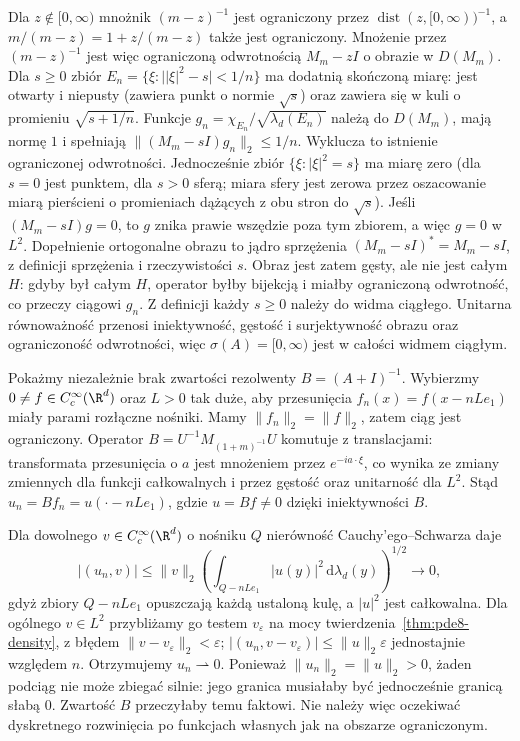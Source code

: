 \begin{kontrprzyklad}
Dla $z\notin[0,\infty)$ mnożnik $(m-z)^{-1}$ jest
ograniczony przez $\operatorname{dist}(z,[0,\infty))^{-1}$,
a $m/(m-z)=1+z/(m-z)$ także jest ograniczony.
Mnożenie przez $(m-z)^{-1}$ jest więc ograniczoną
odwrotnością $M_m-zI$ o obrazie w $D(M_m)$.
Dla $s\ge0$ zbiór
$E_n=\{\xi:\big||\xi|^2-s\big|<1/n\}$ ma dodatnią
skończoną miarę: jest otwarty i niepusty (zawiera
punkt o normie $\sqrt{s}$) oraz zawiera się w kuli
o promieniu $\sqrt{s+1/n}$. Funkcje $g_n=\chi_{E_n}/\sqrt{\lambda_d(E_n)}$
należą do $D(M_m)$, mają normę $1$ i spełniają
$\|(M_m-sI)g_n\|_2\le1/n$. Wyklucza to istnienie
ograniczonej odwrotności. Jednocześnie zbiór
$\{\xi:|\xi|^2=s\}$ ma miarę zero (dla $s=0$ jest
punktem, dla $s>0$ sferą; miara sfery jest zerowa
przez oszacowanie miarą pierścieni o promieniach
dążących z obu stron do $\sqrt{s}$).
Jeśli $(M_m-sI)g=0$, to $g$ znika prawie wszędzie
poza tym zbiorem, a więc $g=0$ w $L^2$.
Dopełnienie ortogonalne obrazu to jądro sprzężenia
$(M_m-sI)^*=M_m-sI$, z definicji sprzężenia
i rzeczywistości $s$. Obraz jest zatem gęsty,
ale nie jest całym $H$: gdyby był całym $H$,
operator byłby bijekcją i miałby ograniczoną odwrotność,
co przeczy ciągowi $g_n$.
Z definicji każdy $s\ge0$ należy do widma ciągłego.
Unitarna równoważność przenosi iniektywność, gęstość
i surjektywność obrazu oraz ograniczoność odwrotności,
więc $\sigma(A)=[0,\infty)$ jest w całości widmem ciągłym.

Pokażmy niezależnie brak zwartości rezolwenty $B=(A+I)^{-1}$.
Wybierzmy $0\ne f\in C_c^\infty(\R^d)$ oraz $L>0$
tak duże, aby przesunięcia
$f_n(x)=f(x-nLe_1)$ miały parami rozłączne nośniki.
Mamy $\|f_n\|_2=\|f\|_2$, zatem ciąg jest ograniczony.
Operator $B=U^{-1}M_{(1+m)^{-1}}U$ komutuje
z translacjami: transformata przesunięcia o $a$
jest mnożeniem przez $e^{-ia\cdot\xi}$, co wynika
ze zmiany zmiennych dla funkcji całkowalnych
i przez gęstość oraz unitarność dla $L^2$.
Stąd $u_n=Bf_n=u(\cdot-nLe_1)$, gdzie $u=Bf\ne0$
dzięki iniektywności $B$.

Dla dowolnego $v\in C_c^\infty(\R^d)$ o nośniku $Q$
nierówność Cauchy'ego--Schwarza daje
\[
 |(u_n,v)|\le\|v\|_2
 \left(\int_{Q-nLe_1}|u(y)|^2\,\mathrm d\lambda_d(y)
 \right)^{1/2}\longrightarrow0,
\]
gdyż zbiory $Q-nLe_1$ opuszczają każdą ustaloną kulę,
a $|u|^2$ jest całkowalna. Dla ogólnego $v\in L^2$
przybliżamy go testem $v_\varepsilon$ na mocy
twierdzenia~\ref{thm:pde8-density}, z błędem
$\|v-v_\varepsilon\|_2<\varepsilon$;
$|(u_n,v-v_\varepsilon)|\le\|u\|_2\varepsilon$
jednostajnie względem $n$. Otrzymujemy $u_n\rightharpoonup0$.
Ponieważ $\|u_n\|_2=\|u\|_2>0$, żaden podciąg nie może
zbiegać silnie: jego granica musiałaby być jednocześnie
granicą słabą $0$. Zwartość $B$ przeczyłaby temu faktowi.
Nie należy więc oczekiwać dyskretnego rozwinięcia
po funkcjach własnych jak na obszarze ograniczonym.
\end{kontrprzyklad}

